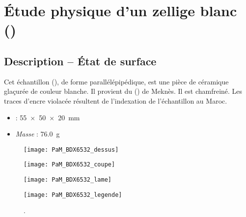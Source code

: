 
\chapter{Étude physique d'un zellige blanc ()}

\section{Description -- État de surface}

Cet échantillon (), de forme parallélépipédique, 
est une pièce de céramique glaçurée de couleur blanche. Il provient 
du \PaM () de Meknès. Il est chamfreiné. Les traces d'encre 
violacée résultent de l'indexation de l'échantillon au Maroc.

\begin{itemize}
  \item \DimText : \SI{55x50x20}{\mm}
  \item \emph{Masse} : \SI{76.0}{\g}
\end{itemize}


\begin{figure}[htb]
  \begin{minipage}[t]{6cm}
    \centerfloat
    \vspace*{0pt}
    \texttt{[image: PaM\_BDX6532\_dessus]}

    \bigskip
    \bigskip
    \bigskip

    \texttt{[image: PaM\_BDX6532\_coupe]}
  \end{minipage}%
  \qquad%
  \begin{minipage}[t]{7.8cm}
    \centerfloat
    \vspace*{0pt}
    \texttt{[image: PaM\_BDX6532\_lame]}

    \bigskip
    \bigskip

    \RaggedRight

    \texttt{[image: PaM\_BDX6532\_legende]}
  \end{minipage}
  \caption[]{\legendeE.}
  \label{dessin:6532}
\end{figure}

